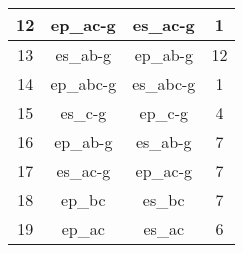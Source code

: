 \documentclass[conference]{IEEEtran}
\begin{document}
\begin{table}[htp]
\begin{tabular}{|c|c|c|c|}
12                                                           & ep\_ac-g                                                              & es\_ac-g                                                                 & 1                                                                                                                            \\ \hline
13                                                           & es\_ab-g                                                              & ep\_ab-g                                                                 & 12                                                                                                                           \\ \hline
14                                                           & ep\_abc-g                                                             & es\_abc-g                                                                & 1                                                                                                                            \\ \hline
15                                                           & es\_c-g                                                               & ep\_c-g                                                                  & 4                                                                                                                            \\ \hline
16                                                           & ep\_ab-g                                                              & es\_ab-g                                                                 & 7                                                                                                                            \\ \hline
17                                                           & es\_ac-g                                                              & ep\_ac-g                                                                 & 7                                                                                                                            \\ \hline
18                                                           & ep\_bc                                                                & es\_bc                                                                   & 7                                                                                                                            \\ \hline
19                                                           & ep\_ac                                                                & es\_ac                                                                   & 6                                                                                                                            \\ \hline
\end{tabular}
\label{misTable}
\end{table}
\end{document}

